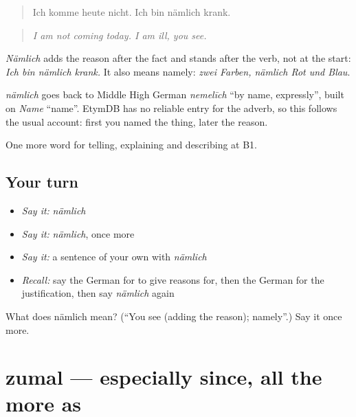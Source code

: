 \begin{quote}
Ich komme heute nicht. Ich bin nämlich krank.
\end{quote}

\begin{quote}
\emph{I am not coming today. I am ill, you see.}
\end{quote}

\emph{Nämlich} adds the reason after the fact and stands after the verb, not at the start: \emph{Ich bin nämlich krank.} It also means namely: \emph{zwei Farben, nämlich Rot und Blau}.

\begin{cousinweb}
\emph{nämlich} goes back to Middle High German \emph{nemelīch} \textquotedblleft{}by name, expressly\textquotedblright{}, built on \emph{Name} \textquotedblleft{}name\textquotedblright{}. EtymDB has no reliable entry for the adverb, so this follows the usual account: first you named the thing, later the reason.
\end{cousinweb}

\begin{grammarlens}[title={What you've built}]
One more word for telling, explaining and describing at B1.
\end{grammarlens}

\subsection*{Your turn}
\begin{itemize}
\raggedright
  \item \emph{Say it:} \emph{nämlich}
  \item \emph{Say it:} \emph{nämlich}, once more
  \item \emph{Say it:} a sentence of your own with \emph{nämlich}
  \item \emph{Recall:} say the German for to give reasons for, then the German for the justification, then say \emph{nämlich} again
\end{itemize}

\begin{tcolorbox}[breakable,colback=teal!4,colframe=teal!35!black,title={Before you move on}]
What does nämlich mean? (\textquotedblleft{}You see (adding the reason); namely\textquotedblright{}.) Say it once more.
\end{tcolorbox}
\section[zumal]{zumal — especially since, all the more as}

